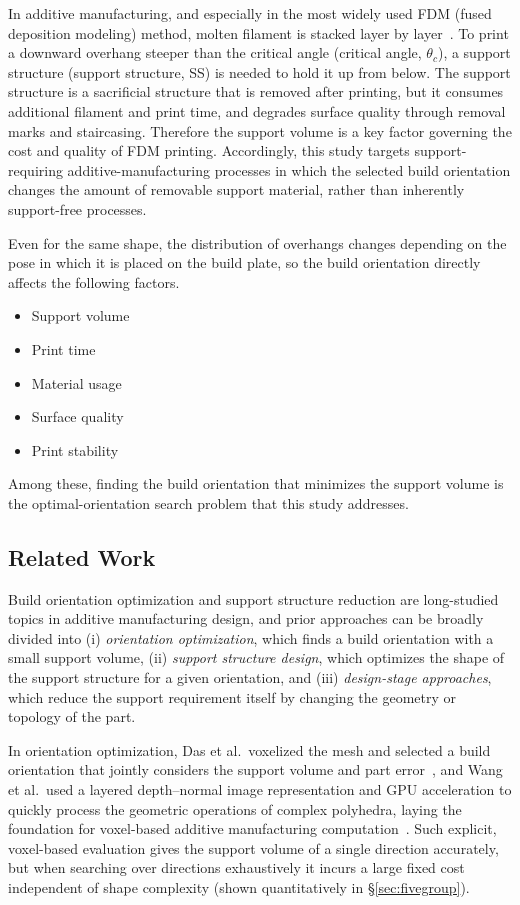\documentclass[11pt,a4paper]{article}
\begin{document}
In additive manufacturing, and especially in the most widely used FDM (fused deposition modeling) method,
molten filament is stacked layer by layer~\cite{gibson}.
To print a downward overhang steeper than the critical angle (critical angle, $\theta_c$),
a support structure (support structure, SS) is needed to hold it up from below.
The support structure is a sacrificial structure that is removed after printing, but it consumes additional filament and print time,
and degrades surface quality through removal marks and staircasing.
Therefore the support volume is a key factor governing the cost and quality of FDM printing.
Accordingly, this study targets support-requiring additive-manufacturing processes in which the selected build orientation changes the amount of removable support material, rather than inherently support-free processes.

Even for the same shape, the distribution of overhangs changes depending on the pose in which it is placed on the build plate,
so the build orientation directly affects the following factors.

\begin{itemize}
\item Support volume
\item Print time
\item Material usage
\item Surface quality
\item Print stability
\end{itemize}

Among these, finding the build orientation that minimizes the support volume is the optimal-orientation search problem that this study addresses.

\subsection{Related Work}
\label{sec:related}

Build orientation optimization and support structure reduction are long-studied topics in additive manufacturing design,
and prior approaches can be broadly divided into (i) \emph{orientation optimization}, which finds a build orientation with a small support volume,
(ii) \emph{support structure design}, which optimizes the shape of the support structure for a given orientation,
and (iii) \emph{design-stage approaches}, which reduce the support requirement itself by changing the geometry or topology of the part.

In orientation optimization, Das et al.\ voxelized the mesh and selected a build orientation that jointly considers the support volume and part error~\cite{das2017},
and Wang et al.\ used a layered depth--normal image representation and GPU acceleration to quickly process the geometric operations of complex polyhedra,
laying the foundation for voxel-based additive manufacturing computation~\cite{wang2010}.
Such explicit, voxel-based evaluation gives the support volume of a single direction accurately,
but when searching over directions exhaustively it incurs a large fixed cost independent of shape complexity
(shown quantitatively in \S\ref{sec:fivegroup}).
\end{document}
